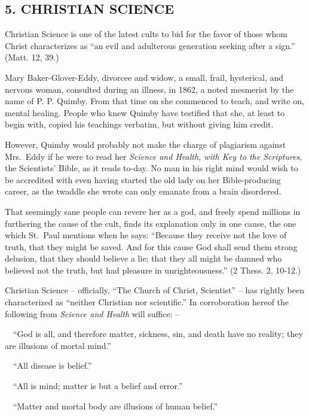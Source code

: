 \documentclass[
]{book}
\begin{document}
\subsection*{5. CHRISTIAN SCIENCE}\label{christian-science}

Christian Science is one of the latest cults to bid for the favor of those whom Christ characterizes as ``an evil and adulterous generation seeking after a sign.'' (Matt. 12, 39.)

Mary Baker-Glover-Eddy, divorcee and widow, a small, frail, hysterical, and nervous woman, consulted during an illness, in 1862, a noted mesmerist by the name of P. P. Quimby. From that time on she commenced to teach, and write on, mental healing. People who knew Quimby have testified that she, at least to begin with, copied his teachings verbatim, but without giving him credit.

However, Quimby would probably not make the charge of plagiarism against Mrs.~Eddy if he were to read her \emph{Science and Health, with Key to the Scriptures}, the Scientists' Bible, as it reads to-day. No man in his right mind would wish to be accredited with even having started the old lady on her Bible-producing career, as the twaddle she wrote can only emanate from a brain disordered.

That seemingly sane people can revere her as a god, and freely spend millions in furthering the cause of the cult, finds its explanation only in one cause, the one which St.~Paul mentions when he says: ``Because they receive not the love of truth, that they might be saved. And for this cause God shall send them strong delusion, that they should believe a lie; that they all might be damned who believed not the truth, but had pleasure in unrighteousness.'' (2 Thess. 2, 10-12.)

Christian Science -- officially, ``The Church of Christ, Scientist'' -- has rightly been characterized as ``neither Christian nor scientific.'' In corroboration hereof the following from \emph{Science and Health} will suffice: --

~~``God is all, and therefore matter, sickness, sin, and death have no reality; they are illusions of mortal mind.''

~~``All disease is belief.''

~~``All is mind; matter is but a belief and error.''

~~``Matter and mortal body are illusions of human belief.''
\end{document}
